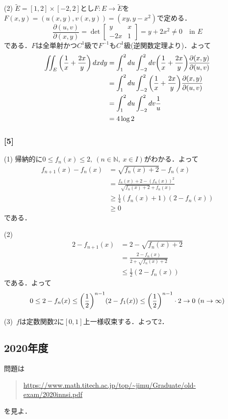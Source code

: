 \documentclass[a4j]{ltjsarticle}
\newcommand{\Nset}{\mathbb{N}}
\newcommand{\1}{\mathbbm{1}}
\numberwithin{equation}{section}
\theoremstyle{definition}
\begin{document}
(2) $\widetilde{E}=[1,2]\times [-2,2]$とし$F\colon E\to \widetilde{E}$を$F(x,y)=(u(x,y),v(x,y))=(xy,y-x^2)$で定める．
\begin{equation}
    \frac{\partial(u,v)}{\partial(x,y)}=\det\begin{bmatrix}
        y & x \\
        -2x & 1 
    \end{bmatrix}=y+2x^2\neq0\quad \text{in $E$}
\end{equation}
である．$F$は全単射かつ$C^1$級で$F^{-1}$も$C^1$級(逆関数定理より)．よって
\begin{align}
    \iint_{E}\qty(\frac{1}{x}+\frac{2x}{y})\,dxdy&=\int_1^2du\int_{-2}^{2}dv\qty(\frac{1}{x}+\frac{2x}{y})\frac{\partial(x,y)}{\partial(u,v)}\\
    &=\int_1^2du\int_{-2}^{2}\qty(\frac{1}{x}+\frac{2x}{y})\frac{\partial(x,y)}{\partial(u,v)}\\
    &=\int_{1}^2du\int_{-2}^2dv\frac{1}{u}\\
    &=4\log2
\end{align}

\subsubsection*{[5]}
(1) 帰納的に$0\leq f_n(x)\leq 2,\ (n\in\Nset,\ x\in I)$がわかる．よって
\begin{align}
    f_{n+1}(x)-f_n(x)&=\sqrt{f_n(x)+2}-f_n(x)\\
    &=\frac{f_n(x)+2-(f_n(x))^2}{\sqrt{f_n(x)+2}+f_n(x)}\\
    &\geq \frac{1}{4}(f_n(x)+1)(2-f_n(x))\\
    &\geq0 
\end{align}
である．

(2) 
\begin{align}
    2-f_{n+1}(x)&=2-\sqrt{f_n(x)+2}\\
    &=\frac{2-f_n(x)}{2+\sqrt{f_n(x)+2}}\\
    &\leq \frac{1}{2}(2-f_n(x)) 
\end{align}
である．よって
\begin{equation}
    0\leq 2-f_n(x)\leq \qty(\frac{1}{2})^{n-1}(2-f_1(x))\leq \qty(\frac{1}{2})^{n-1}\cdot 2\to0 \ (n\to\infty)
\end{equation}

(3)\ $f$は定数関数$2$に$[0,1]$上一様収束する．よって2．
\subsection{2020年度}
問題は
\begin{quote}
    \url{https://www.math.titech.ac.jp/top/~jimu/Graduate/old-exam/2020innsi.pdf}
\end{quote}
を見よ．
\end{document}
